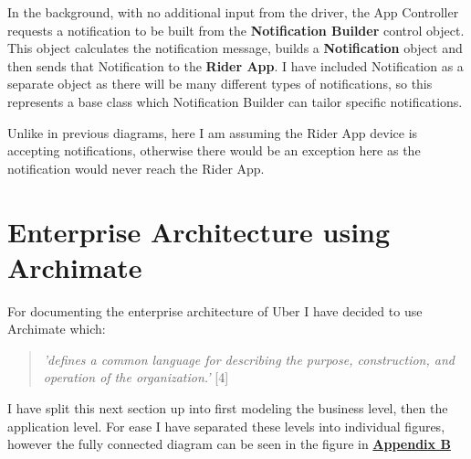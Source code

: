 \documentclass{article}
\begin{document}
    In the background, with no additional input from the driver, the App Controller requests a notification to be built from the \textbf{Notification Builder} control object.
    This object calculates the notification message, builds a \textbf{Notification} object and then sends that Notification to the \textbf{Rider App}.
    I have included Notification as a separate object as there will be many different types of notifications, so this represents a base class which Notification Builder
    can tailor specific notifications.

    Unlike in previous diagrams, here I am assuming the Rider App device is accepting notifications, otherwise there would be an exception here as the 
    notification would never reach the Rider App.

    \newpage
    \section{Enterprise Architecture using Archimate}
    For documenting the enterprise architecture of Uber I have decided to use Archimate which:
    \begin{quote}
      \textit{'defines a common language for describing the purpose, construction, and operation of the organization.'} [4]
    \end{quote}
    I have split this next section up into first modeling the business level, then the application level. For ease I have separated these levels into
    individual figures, however the fully connected diagram can be seen in the figure in \hyperref[sec:AppendixB]{\textbf{Appendix B}}
\end{document}
